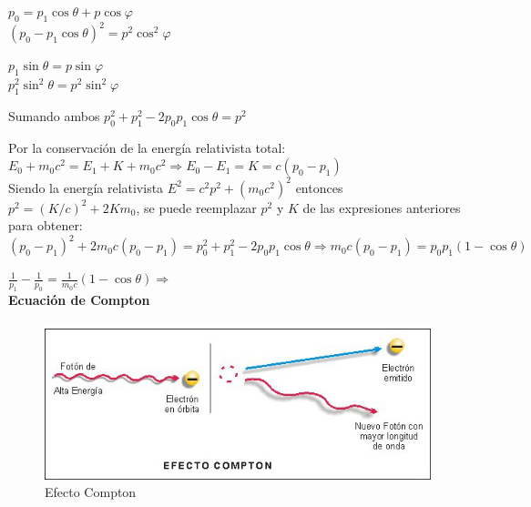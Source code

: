 \documentclass[oneside]{book}
\numberwithin{equation}{section}
\numberwithin{figure}{section}
\numberwithin{table}{section}
\begin{document}
			\begin{center}
				\begin{minipage}[t]{0.25\textwidth}
					$p_0=p_1\cos \theta + p\cos \varphi$\\
					$(p_0-p_1\cos \theta)^2=p^2\cos^2 \varphi$\\
				\end{minipage}
				\begin{minipage}[t]{0.25\textwidth}
					$p_1\sin \theta = p\sin \varphi$\\
					$p_1^2\sin^2 \theta=p^2\sin^2 \varphi$\\
				\end{minipage}
			\end{center}
			\begin{center}
			Sumando ambos $p_0^2+p_1^2-2p_0p_1\cos \theta=p^2$\\
			\end{center}
			
		Por la conservación de la energía relativista total: $E_0+m_0c^2=E_1+K+m_0c^2 \Rightarrow E_0-E_1=K=c(p_0-p_1)$\\
		
		Siendo la energía relativista $E^2=c^2p^2+(m_0c^2)^2$ entonces $p^2=(K/c)^2+2Km_0$, se puede reemplazar $p^2$ y $K$ de las expresiones anteriores para obtener:\\
		
		$(p_0-p_1)^2+2m_0c(p_0-p_1)=p_0^2+p_1^2-2p_0p_1\cos \theta \Rightarrow m_0c(p_0-p_1)=p_0p_1(1-\cos \theta)$\\
		
		\begin{center}
		$\frac{1}{p_1}-\frac{1}{p_0}=\frac{1}{m_0c}(1-\cos \theta) \Rightarrow$ \\
		\textbf{Ecuación de Compton}
		\end{center}
		
		\begin{figure}
			\includegraphics[scale=0.75]{Compton.jpeg}
		 	\caption{Efecto Compton}
		\end{figure}		
		
\end{document}
